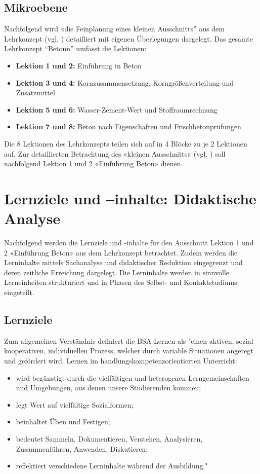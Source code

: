 \documentclass[
11pt,
captions=tableheading,
smallheadings,
headsepline,
footsepline, 
parskip=half-,
]{scrartcl}
\begin{document}
\subsection{Mikroebene}
Nachfolgend wird «die Feinplanung eines kleinen Ausschnitts” aus dem Lehrkonzept (vgl. \cite{Leitfaden_Aufgabenstellung_Lehrkonzept}) detailliert mit eigenen Überlegungen dargelegt. Das gesamte Lehrkonzept “Betonn” umfasst die Lektionen: 

\begin{itemize}[leftmargin=*, labelsep=0.5cm]
    \item \textbf{Lektion 1 und 2:} Einführung in Beton
    \item \textbf{Lektion 3 und 4:} Kornzusammensetzung, Korngrößenverteilung und Zusatzmittel
    \item \textbf{Lektion 5 und 6:} Wasser-Zement-Wert und Stoffraumrechnung
    \item \textbf{Lektion 7 und 8:} Beton nach Eigenschaften und Frischbetonprüfungen
\end{itemize}

Die 8 Lektionen des Lehrkonzepts teilen sich auf in 4 Blöcke zu je 2 Lektionen auf.
Zur detaillierten Betrachtung des «kleinen Ausschnitts» (vgl. \cite{Leitfaden_Aufgabenstellung_Lehrkonzept})  soll nachfolgend Lektion 1 und 2 «Einführung Beton» dienen. 

\section{Lernziele und –inhalte: Didaktische Analyse}
\label{sec:Lernziele}
Nachfolgend werden die Lernziele und -inhalte für den Ausschnitt Lektion 1 und 2 «Einführung Beton» aus dem Lehrkonzept betrachtet. Zudem werden die Lerninhalte mittels Sachanalyse und didaktischer Reduktion eingegrenzt und deren zeitliche Erreichung dargelegt. Die Lerninhalte werden in sinnvolle Lerneinheiten strukturiert und in Phasen des Selbst- und Kontaktstudiums eingeteilt.   


\subsection{Lernziele}
Zum allgemeinen Verständnis definiert die BSA Lernen als "einen aktiven, sozial kooperativen, individuellen Prozess, welcher durch variable Situationen angeregt und gefördert wird. Lernen im handlungskompetenzorientierten Unterricht:
\begin{itemize}
    \item wird begünstigt durch die vielfältigen und heterogenen Lerngemeinschaften und Umgebungen, aus denen unsere Studierenden kommen;
    \item legt Wert auf vielfältige Sozialformen;
    \item beinhaltet Üben und Festigen;
    \item bedeutet Sammeln, Dokumentieren, Verstehen, Analysieren, Zusammenführen, Anwenden, Diskutieren;
    \item reflektiert verschiedene Lerninhalte während der Ausbildung."
\end{itemize}
\end{document}
